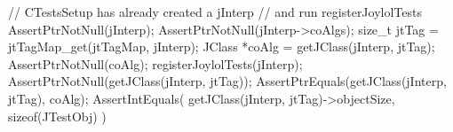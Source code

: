 
\startCTest
  // CTestsSetup has already created a jInterp
  // and run registerJoylolTests
  AssertPtrNotNull(jInterp);
  AssertPtrNotNull(jInterp->coAlgs);
  size_t jtTag = jtTagMap_get(jtTagMap, jInterp);
  JClass *coAlg = getJClass(jInterp, jtTag);
  AssertPtrNotNull(coAlg);
  registerJoylolTests(jInterp);
  AssertPtrNotNull(getJClass(jInterp, jtTag));
  AssertPtrEquals(getJClass(jInterp, jtTag), coAlg);
  AssertIntEquals(
    getJClass(jInterp, jtTag)->objectSize,
    sizeof(JTestObj)
  )
\stopCTest
\stopTestCase
\stopTestSuite